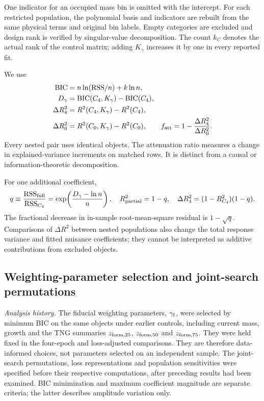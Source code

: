 \documentclass[11pt,a4paper]{article}
\begin{document}
One indicator for an occupied mass bin is omitted with the intercept. For each restricted population, the polynomial basis and indicators are rebuilt from the same physical terms and original bin labels. Empty categories are excluded and design rank is verified by singular-value decomposition. The count $k_C$ denotes the actual rank of the control matrix; adding $K_\gamma$ increases it by one in every reported fit.

We use
\begin{align}
\mathrm{BIC}&=n\ln(\mathrm{RSS}/n)+k\ln n,\\
D_\gamma&=\mathrm{BIC}(C_4,K_\gamma)-\mathrm{BIC}(C_4),\\
\Delta R^2_4&=R^2(C_4,K_\gamma)-R^2(C_4),\\
\Delta R^2_0&=R^2(C_0,K_\gamma)-R^2(C_0),\qquad
f_{\rm att}=1-\frac{\Delta R^2_4}{\Delta R^2_0}.\label{eq:att}
\end{align}
Every nested pair uses identical objects. The attenuation ratio measures a change in explained-variance increments on matched rows. It is distinct from a causal or information-theoretic decomposition.

For one additional coefficient,
\begin{equation}
q\equiv\frac{\mathrm{RSS}_{\rm full}}{\mathrm{RSS}_{C_4}}=
\exp\!\left(\frac{D_\gamma-\ln n}{n}\right),\quad
R^2_{\rm partial}=1-q,\quad
\Delta R^2_4=(1-R^2_{C_4})(1-q).\label{eq:partial}
\end{equation}
The fractional decrease in in-sample root-mean-square residual is $1-\sqrt q$. Comparisons of $\Delta R^2$ between nested populations also change the total response variance and fitted nuisance coefficients; they cannot be interpreted as additive contributions from excluded objects.

\subsection{Weighting-parameter selection and joint-search permutations}\label{sec:search}
\textit{Analysis history.} The fiducial weighting parameters, $\gamma_{\rm f}$, were selected by minimum BIC on the same objects under earlier controls, including current mass, growth and the TNG summaries $z_{\rm form,25}$, $z_{\rm form,50}$ and $z_{\rm form,75}$. They were held fixed in the four-epoch and loss-adjusted comparisons. They are therefore data-informed choices, not parameters selected on an independent sample. The joint-search permutations, loss representations and population sensitivities were specified before their respective computations, after preceding results had been examined. BIC minimization and maximum coefficient magnitude are separate criteria; the latter describes amplitude variation only.
\end{document}
